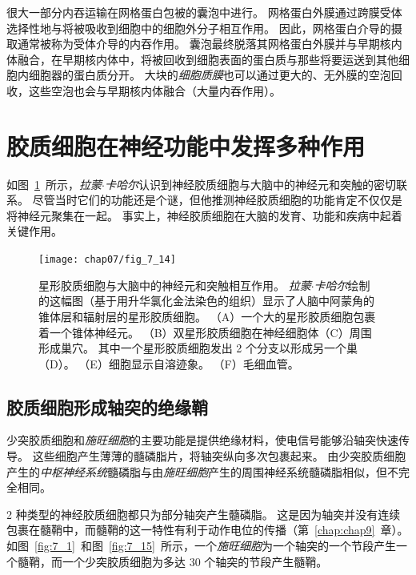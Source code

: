 很大一部分内吞运输在网格蛋白包被的囊泡中进行。
网格蛋白外膜通过跨膜受体选择性地与将被吸收到细胞中的细胞外分子相互作用。
因此，网格蛋白介导的摄取通常被称为受体介导的内吞作用。
囊泡最终脱落其网格蛋白外膜并与早期核内体融合，在早期核内体中，将被回收到细胞表面的蛋白质与那些将要运送到其他细胞内细胞器的蛋白质分开。
大块的\textit{细胞质膜}也可以通过更大的、无外膜的空泡回收，这些空泡也会与早期核内体融合（大量内吞作用）。



\section{胶质细胞在神经功能中发挥多种作用}

如图~\ref{fig:7_14}~所示，\textit{拉蒙$\cdot$卡哈尔}认识到神经胶质细胞与大脑中的神经元和突触的密切联系。
尽管当时它们的功能还是个谜，但他推测神经胶质细胞的功能肯定不仅仅是将神经元聚集在一起。
事实上，神经胶质细胞在大脑的发育、功能和疾病中起着关键作用。


\begin{figure}[htbp]
	\centering
	\texttt{[image: chap07/fig\_7\_14]}
	\caption{星形胶质细胞与大脑中的神经元和突触相互作用。
		\textit{拉蒙$\cdot$卡哈尔}绘制的这幅图（基于用升华氯化金法染色的组织）显示了人脑中阿蒙角的锥体层和辐射层的星形胶质细胞。
		（A）一个大的星形胶质细胞包裹着一个锥体神经元。
		（B）双星形胶质细胞在神经细胞体（C）周围形成巢穴。
		其中一个星形胶质细胞发出 2 个分支以形成另一个巢（D）。
		（E）细胞显示自溶迹象。
		（F）毛细血管。 }
	\label{fig:7_14}
\end{figure}



\subsection{胶质细胞形成轴突的绝缘鞘}

少突胶质细胞和\textit{施旺细胞}的主要功能是提供绝缘材料，使电信号能够沿轴突快速传导。
这些细胞产生薄薄的髓磷脂片，将轴突纵向多次包裹起来。
由少突胶质细胞产生的\textit{中枢神经系统}髓磷脂与由\textit{施旺细胞}产生的周围神经系统髓磷脂相似，但不完全相同。


2 种类型的神经胶质细胞都只为部分轴突产生髓磷脂。
这是因为轴突并没有连续包裹在髓鞘中，而髓鞘的这一特性有利于动作电位的传播（第~\ref{chap:chap9}~章）。 
如图~\ref{fig:7_1}~和图~\ref{fig:7_15}~所示，一个\textit{施旺细胞}为一个轴突的一个节段产生一个髓鞘，而一个少突胶质细胞为多达 30 个轴突的节段产生髓鞘。


